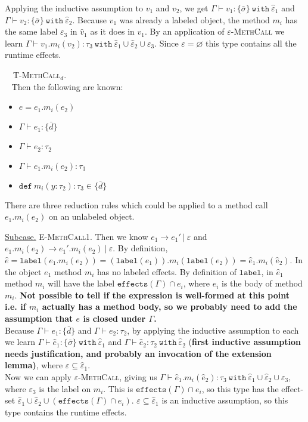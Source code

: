 \documentclass{llncs}
\newcommand{\keywadj}[1]{\mathtt{#1}}
\newcommand{\keyw}[1]{\keywadj{#1}~}
\newcommand{\kw}[1]{\keyw{ #1 }}
\newcommand{\kwa}[1]{\keywadj{ #1 }}
\newcommand{\proofcase}[2]{
	\begin{adjustwidth}{1.5em}{0pt}
		\fbox{Case.}~~#1. \\ ~#2
	\end{adjustwidth}
}
\newcommand{\subcase}[1] {
	\begin{adjustwidth}{2.2em}{0pt}
		\underline{Subcase.} #1
	\end{adjustwidth}
}
\newcommand{\type}[2]{
	#1~\keyw{with} #2
}
\begin{document}
{{{\noindent
Applying the inductive assumption to $v_1$ and $v_2$, we get $\Gamma \vdash v_1 : \type{\{ \bar \sigma \}}{\hat \varepsilon_1}$ and $\Gamma \vdash v_2 : \type{\{ \bar \sigma \}}{\hat \varepsilon_2}$. Because $v_1$ was already a labeled object, the method $m_i$ has the same label $\varepsilon_3$ in $\hat v_1$ as it does in $v_1$. By an application of \textsc{$\varepsilon$-MethCall} we learn $\Gamma \vdash v_1.m_i(v_2) : \type{\tau_3}{\hat \varepsilon_1 \cup \hat \varepsilon_2 \cup \varepsilon_3}$. Since $\varepsilon = \varnothing$ this type contains all the runtime effects.\\	
	}
}

\proofcase{\textsc{T-MethCall$_d$}}{
Then the following are known:
\begin{itemize}
	\item $e = e_1.m_i(e_2)$
	\item $\Gamma \vdash e_1 : \{ \bar d \}$
	\item $\Gamma \vdash e_2 : \tau_2$
	\item $\Gamma \vdash e_1.m_i(e_2) : \tau_3$
	\item $\keywadj{def}~m_i(y:\tau_2) : \tau_3 \in \{ \bar d \}$
\end{itemize}

\noindent
There are three reduction rules which could be applied to a method call $e_1.m_i(e_2)$ on an unlabeled object.\\

	\subcase{\textsc{E-MethCall1}. Then we know $e_1 \longrightarrow e_1'~|~\varepsilon$ and $e_1.m_i(e_2) \longrightarrow e_1'.m_i(e_2)~|~\varepsilon$. By definition, $\hat e = \kwa{label}(e_1.m_i(e_2)) = (\kwa{label}(e_1)).m_i(\kwa{label}(e_2)) = \hat e_1.m_i(\hat e_2)$. In the object $e_1$ method $m_i$ has no labeled effects. By definition of $\kwa{label}$, in $\hat e_1$ method $m_i$ will have the label $\kwa{effects}(\Gamma) \cap e_i$, where $e_i$ is the body of method $m_i$. \textbf{Not possible to tell if the expression is well-formed at this point i.e. if $m_i$ actually has a method body, so we probably need to add the assumption that $e$ is closed under $\Gamma$.}\\
	
\noindent
Because $\Gamma \vdash e_1 : \{ \bar d \}$ and $\Gamma \vdash e_2 : \tau_2$, by applying the inductive assumption to each we learn $\Gamma \vdash \hat e_1 : \type{\{ \bar \sigma \}}{\hat \varepsilon_1}$ and $\Gamma \vdash \hat e_2 : \tau_2~\kw{with} \hat \varepsilon_2$ (\textbf{first inductive assumption needs justification, and probably an invocation of the extension lemma)}, where $\varepsilon \subseteq \hat \varepsilon_1$. \\

\noindent
Now we can apply \textsc{$\varepsilon$-MethCall}, giving us $\Gamma \vdash \hat e_1.m_i(\hat e_2) : \type{\tau_3}{\hat \varepsilon_1 \cup \hat \varepsilon_2 \cup \varepsilon_3 }$, where $\varepsilon_3$ is the label on $m_i$. This is $\kwa{effects}(\Gamma) \cap e_i$, so this type has the effect-set $\hat \varepsilon_1 \cup \hat \varepsilon_2 \cup (\kwa{effects}(\Gamma) \cap e_i)$. $\varepsilon \subseteq \hat \varepsilon_1$ is an inductive assumption, so this type contains the runtime effects.
	}
}
}
\end{document}
